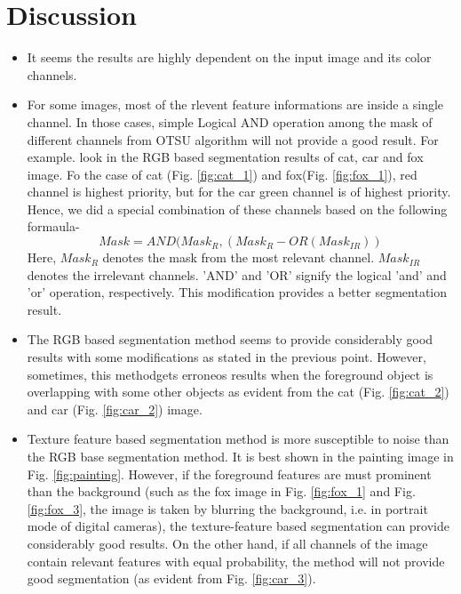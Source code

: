 \documentclass{article}
\begin{document}
\section{Discussion}
\begin{itemize}
\item It seems the results are highly dependent on the input image and its color channels.
\item For some images, most of the rlevent feature informations are inside a single channel. In those cases, simple Logical AND operation among the mask of different channels from OTSU algorithm will not provide a good result. For example. look in the RGB based segmentation results of cat, car and fox image. Fo the case of cat (Fig. \ref{fig:cat_1}) and fox(Fig. \ref{fig:fox_1}), red channel is highest priority, but for the car green channel is of highest priority. Hence, we did a special combination of these channels based on the following formaula-
\begin{equation}
	Mask = AND(Mask_R, (Mask_R - OR(Mask_{IR}))
\end{equation}
Here, $Mask_R$ denotes the mask from the most relevant channel. $Mask_{IR}$ denotes the irrelevant channels. 'AND' and 'OR' signify the logical 'and' and 'or' operation, respectively. This modification provides a better segmentation result.
\item The RGB based segmentation method seems to provide considerably good results with some modifications as stated in the previous point. However, sometimes, this methodgets erroneos results when the foreground object is overlapping with some other objects as evident from the cat (Fig. \ref{fig:cat_2}) and car (Fig. \ref{fig:car_2}) image.
\item Texture feature based segmentation method is more susceptible to noise than the RGB base segmentation method. It is best shown in the painting image in Fig. \ref{fig:painting}. However, if the foreground features are must prominent than the background (such as the fox image in Fig. \ref{fig:fox_1} and Fig. \ref{fig:fox_3}, the image is taken by blurring the background, i.e. in portrait mode of digital cameras), the texture-feature based segmentation can provide considerably good results. On the other hand, if all channels of the image contain relevant features with equal probability, the method will not provide good segmentation (as evident from Fig. \ref{fig:car_3}).
\end{itemize}

\newpage
\end{document}
